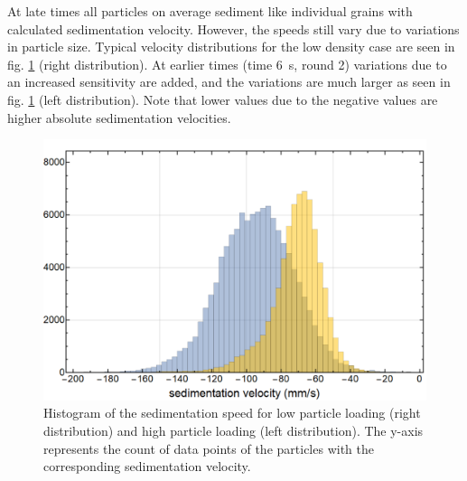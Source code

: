 At late times all particles on average sediment like individual grains with calculated sedimentation velocity. However, the speeds still vary due to variations in particle size.  Typical velocity distributions for the low density case are seen in fig. \ref{fig.speed1} (right distribution).
At earlier times (time 6~s, round 2) variations due to an increased sensitivity are added, and the variations are much larger as seen in fig. \ref{fig.speed1} (left distribution). Note that lower values due to the negative values are higher absolute sedimentation velocities. 

\begin{figure}[h]
\includegraphics[width=\columnwidth]{veloc2and9.pdf}
    \caption{\label{fig.speed1} {Histogram of the }sedimentation speed for low particle loading (right distribution) and high particle loading (left distribution). {The y-axis represents the count of data points of the particles with the corresponding sedimentation velocity.}}
\end{figure}

